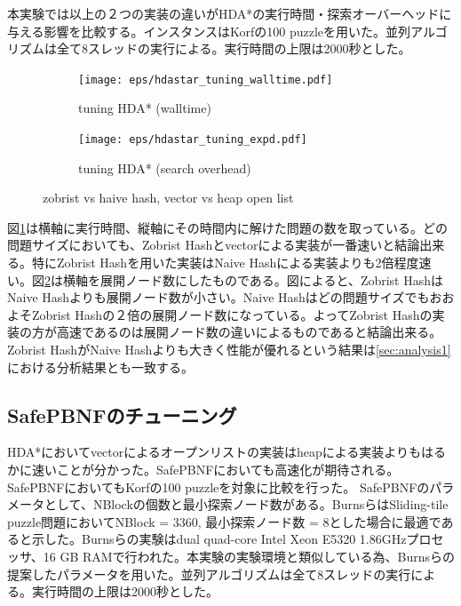 \documentclass[uplatex]{jsarticle}
\begin{document}
本実験では以上の２つの実装の違いがHDA*の実行時間・探索オーバーヘッドに与える影響を比較する。インスタンスはKorfの100 puzzleを用いた\cite{korf1985depth}。並列アルゴリズムは全て8スレッドの実行による。実行時間の上限は2000秒とした。

\begin{figure}
	\centering
	\begin{subfigure}{0.4\columnwidth}
		\texttt{[image: eps/hdastar\_tuning\_walltime.pdf]}
		\caption{tuning HDA* (walltime)}
		\label{fig:hdastar_tuning_walltime}
	\end{subfigure}
	\begin{subfigure}{0.4\columnwidth}
		\texttt{[image: eps/hdastar\_tuning\_expd.pdf]}
		\caption{tuning HDA* (search overhead)}
		\label{fig:hdastar_tuning_expd}
	\end{subfigure}
	\caption{zobrist vs haive hash, vector vs heap open list}
	\label{fig:hdastar_tuning}
\end{figure}

図\ref{fig:hdastar_tuning_walltime}は横軸に実行時間、縦軸にその時間内に解けた問題の数を取っている。どの問題サイズにおいても、Zobrist Hashとvectorによる実装が一番速いと結論出来る。特にZobrist Hashを用いた実装はNaive Hashによる実装よりも2倍程度速い。図\ref{fig:hdastar_tuning_expd}は横軸を展開ノード数にしたものである。図によると、Zobrist HashはNaive Hashよりも展開ノード数が小さい。Naive Hashはどの問題サイズでもおおよそZobrist Hashの２倍の展開ノード数になっている。よってZobrist Hashの実装の方が高速であるのは展開ノード数の違いによるものであると結論出来る。Zobrist HashがNaive Hashよりも大きく性能が優れるという結果は\ref{sec:analysis1}における分析結果とも一致する。


\subsection{SafePBNFのチューニング}
\label{sec:pbnf_tuning}

HDA*においてvectorによるオープンリストの実装はheapによる実装よりもはるかに速いことが分かった。SafePBNFにおいても高速化が期待される。SafePBNFにおいてもKorfの100 puzzleを対象に比較を行った。
SafePBNFのパラメータとして、NBlockの個数と最小探索ノード数がある。BurnsらはSliding-tile puzzle問題においてNBlock = 3360, 最小探索ノード数 = 8とした場合に最適であると示した。Burnsらの実験はdual quad-core Intel Xeon E5320 1.86GHzプロセッサ、16 GB RAMで行われた。本実験の実験環境と類似している為、Burnsらの提案したパラメータを用いた。並列アルゴリズムは全て8スレッドの実行による。実行時間の上限は2000秒とした。
\end{document}

